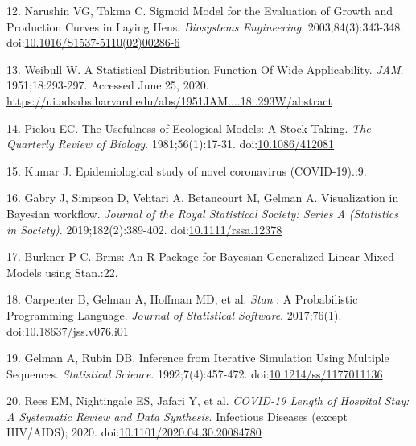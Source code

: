 \documentclass[
]{article}
\begin{document}
\leavevmode\hypertarget{ref-narushin_sigmoid_2003}{}%
12. Narushin VG, Takma C. Sigmoid Model for the Evaluation of Growth and Production Curves in Laying Hens. \emph{Biosystems Engineering}. 2003;84(3):343-348. doi:\href{https://doi.org/10.1016/S1537-5110(02)00286-6}{10.1016/S1537-5110(02)00286-6}

\leavevmode\hypertarget{ref-weibull_statistical_1951}{}%
13. Weibull W. A Statistical Distribution Function Of Wide Applicability. \emph{JAM}. 1951;18:293-297. Accessed June 25, 2020. \url{https://ui.adsabs.harvard.edu/abs/1951JAM....18..293W/abstract}

\leavevmode\hypertarget{ref-pielou_usefulness_1981}{}%
14. Pielou EC. The Usefulness of Ecological Models: A Stock-Taking. \emph{The Quarterly Review of Biology}. 1981;56(1):17-31. doi:\href{https://doi.org/10.1086/412081}{10.1086/412081}

\leavevmode\hypertarget{ref-kumar_epidemiological_nodate}{}%
15. Kumar J. Epidemiological study of novel coronavirus (COVID-19).:9.

\leavevmode\hypertarget{ref-gabry_visualization_2019}{}%
16. Gabry J, Simpson D, Vehtari A, Betancourt M, Gelman A. Visualization in Bayesian workflow. \emph{Journal of the Royal Statistical Society: Series A (Statistics in Society)}. 2019;182(2):389-402. doi:\href{https://doi.org/10.1111/rssa.12378}{10.1111/rssa.12378}

\leavevmode\hypertarget{ref-burkner_brms_nodate}{}%
17. Burkner P-C. Brms: An R Package for Bayesian Generalized Linear Mixed Models using Stan.:22.

\leavevmode\hypertarget{ref-carpenter_stan_2017}{}%
18. Carpenter B, Gelman A, Hoffman MD, et al. \emph{Stan} : A Probabilistic Programming Language. \emph{Journal of Statistical Software}. 2017;76(1). doi:\href{https://doi.org/10.18637/jss.v076.i01}{10.18637/jss.v076.i01}

\leavevmode\hypertarget{ref-gelman_inference_1992}{}%
19. Gelman A, Rubin DB. Inference from Iterative Simulation Using Multiple Sequences. \emph{Statistical Science}. 1992;7(4):457-472. doi:\href{https://doi.org/10.1214/ss/1177011136}{10.1214/ss/1177011136}

\leavevmode\hypertarget{ref-rees_covid-19_2020}{}%
20. Rees EM, Nightingale ES, Jafari Y, et al. \emph{COVID-19 Length of Hospital Stay: A Systematic Review and Data Synthesis}. Infectious Diseases (except HIV/AIDS); 2020. doi:\href{https://doi.org/10.1101/2020.04.30.20084780}{10.1101/2020.04.30.20084780}
\end{document}
